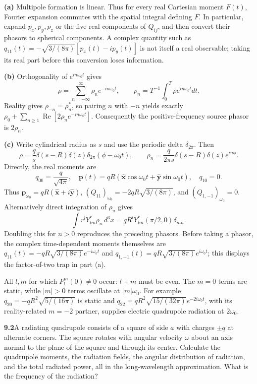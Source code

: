 \textbf{(a)} Multipole formation is linear. Thus for every real Cartesian
moment $F(t)$, Fourier expansion commutes with the spatial integral defining
$F$. In particular, expand $p_x,p_y,p_z$ or the five real components of
$Q_{ij}$, and then convert their phasors to spherical components. A complex
quantity such as $q_{11}(t)=-\sqrt{3/(8\pi)}[p_x(t)-ip_y(t)]$ is not itself a
real observable; taking its real part before this conversion loses information.

\textbf{(b)} Orthogonality of $e^{in\omega_0t}$ gives
\[
\rho=\sum_{n=-\infty}^{\infty}\rho_ne^{-in\omega_0t},\qquad
\rho_n=T^{-1}\int_0^T\rho e^{in\omega_0t}dt.
\]
Reality gives $\rho_{-n}=\rho_n^*$, so pairing $n$ with $-n$ yields exactly
$\rho_0+\sum_{n\ge1}\operatorname{Re}[2\rho_ne^{-in\omega_0t}]$.
Consequently the positive-frequency source phasor is $2\rho_n$.

\textbf{(c)} Write cylindrical radius as $s$ and use the periodic delta
$\delta_{2\pi}$. Then
\[
\rho=\frac q{s}\delta(s-R)\delta(z)\delta_{2\pi}(\phi-\omega_0t),
\qquad
\boxed{\rho_n=\frac q{2\pi s}\delta(s-R)\delta(z)e^{in\phi}.}
\]
Directly, the real moments are
\[
q_{00}=\frac q{\sqrt{4\pi}},\quad
\mathbf p(t)=qR(\hat{\mathbf x}\cos\omega_0t+
\hat{\mathbf y}\sin\omega_0t),\quad q_{10}=0.
\]
Thus $\mathbf p_{\omega_0}=qR(\hat{\mathbf x}+i\hat{\mathbf y})$,
$(Q_{11})_{\omega_0}=-2qR\sqrt{3/(8\pi)}$, and
$(Q_{1,-1})_{\omega_0}=0$.
Alternatively direct integration of $\rho_n$ gives
\[
\int r^lY_{lm}^*\rho_n\,d^3x
=qR^lY_{lm}^*(\pi/2,0)\delta_{mn}.
\]
Doubling this for $n>0$ reproduces the preceding phasors. Before taking a
phasor, the complex time-dependent moments themselves are
$q_{11}(t)=-qR\sqrt{3/(8\pi)}e^{-i\omega_0t}$ and
$q_{1,-1}(t)=qR\sqrt{3/(8\pi)}e^{i\omega_0t}$; this displays the factor-of-two
trap in part (a).

All $l,m$ for which $P_l^m(0)\ne0$ occur: $l+m$ must be even. The $m=0$
terms are static, while $|m|>0$ terms oscillate at $|m|\omega_0$.
For example $q_{20}=-qR^2\sqrt{5/(16\pi)}$ is static and
$q_{22}=qR^2\sqrt{15/(32\pi)}e^{-2i\omega_0t}$, with its reality-related
$m=-2$ partner, supplies electric quadrupole radiation at $2\omega_0$.

\par\bigskip
\noindent\textbf{9.2}\quad A radiating quadrupole consists of a square of side $a$ with charges $\pm q$ at alternate corners. The square rotates with angular velocity $\omega$ about an axis normal to the plane of the square and through its center. Calculate the quadrupole moments, the radiation fields, the angular distribution of radiation, and the total radiated power, all in the long-wavelength approximation. What is the frequency of the radiation?
\solution

